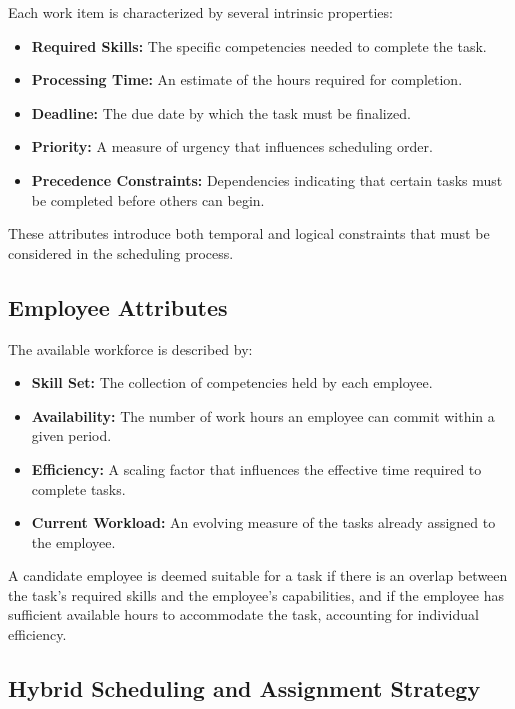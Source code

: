 \documentclass[%
aip,
cp,  %
amsmath,amssymb,
reprint,%
]{revtex4-2}
\begin{document}
	Each work item is characterized by several intrinsic properties:
	\begin{itemize}
		\item \textbf{Required Skills:} The specific competencies needed to complete
		the task.
		
		\item \textbf{Processing Time:} An estimate of the hours required for
		completion.
		
		\item \textbf{Deadline:} The due date by which the task must be finalized.
		
		\item \textbf{Priority:} A measure of urgency that influences scheduling
		order.
		
		\item \textbf{Precedence Constraints:} Dependencies indicating that certain
		tasks must be completed before others can begin.
	\end{itemize}
	These attributes introduce both temporal and logical constraints that must be considered
	in the scheduling process.
	
	\subsection{\label{subsec:employee}Employee Attributes}
	
	The available workforce is described by:
	\begin{itemize}
		\item \textbf{Skill Set:} The collection of competencies held by each
		employee.
		
		\item \textbf{Availability:} The number of work hours an employee can commit
		within a given period.
		
		\item \textbf{Efficiency:} A scaling factor that influences the effective
		time required to complete tasks.
		
		\item \textbf{Current Workload:} An evolving measure of the tasks already
		assigned to the employee.
	\end{itemize}
	A candidate employee is deemed suitable for a task if there is an overlap between
	the task's required skills and the employee's capabilities, and if the
	employee has sufficient available hours to accommodate the task, accounting for
	individual efficiency.
	
	\subsection{\label{subsec:strategy}Hybrid Scheduling and Assignment Strategy}
	
\end{document}
